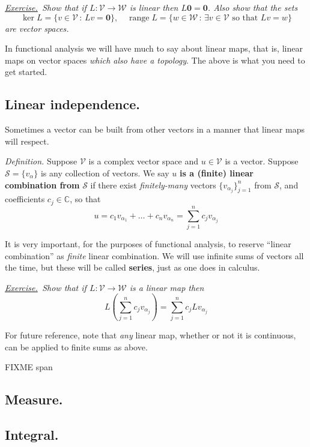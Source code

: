 \documentclass[12pt]{article}
\newcommand{\bzero}{\bm{0}}
\newcommand{\cS}{\mathcal{S}}
\newcommand{\cV}{\mathcal{V}}
\newcommand{\cW}{\mathcal{W}}
\newcommand{\CC}{\mathbb{C}}
\newcommand{\range}{\operatorname{range}}
\newcommand{\sect}[1]{\subsection*{#1.}}
\newcommand{\defin}{\emph{Definition.}\,\,}
\newcommand{\exer}[2]{\emph{\underline{Exercise.}\, #2} \vspace*{#1mm}}
\begin{document}
\clearpage\newpage
\exer{60}{Show that if $L:\cV \to \cW$ is linear then $L\bzero = \bzero$.  Also show that the sets
    $$\ker L = \{v\in\cV\,:\,Lv=\bzero\}, \quad \range L = \{w\in\cW\,:\,\exists v \in \cV \text{ so that } Lv=w\}$$
are vector spaces.}

In functional analysis we will have much to say about linear maps, that is, linear maps on vector spaces \emph{which also have a topology}.  The above is what you need to get started.


\sect{Linear independence}  Sometimes a vector can be built from other vectors in a manner that linear maps will respect.

\defin Suppose $\cV$ is a complex vector space and $u \in \cV$ is a vector.  Suppose $\cS = \{v_\alpha\}$ is any collection of vectors.  We say $u$ \textbf{is a (finite) linear combination from} $\cS$ if there exist \emph{finitely-many} vectors $\{v_{\alpha_j}\}_{j=1}^n$ from $\cS$, and coefficients $c_j\in\CC$, so that
	$$u = c_1 v_{\alpha_1} + \dots + c_n v_{\alpha_n} = \sum_{j=1}^n c_j v_{\alpha_j}$$

It is very important, for the purposes of functional analysis, to reserve ``linear combination'' as \emph{finite} linear combination.  We will use infinite sums of vectors all the time, but these will be called \textbf{series}, just as one does in calculus.

\exer{15}{Show that if $L:\cV \to \cW$ is a linear map then
	$$L\left(\sum_{j=1}^n c_j v_{\alpha_j}\right) = \sum_{j=1}^n c_j L v_{\alpha_j}$$}

\clearpage\newpage
For future reference, note that \emph{any} linear map, whether or not it is continuous, can be applied to finite sums as above.

FIXME span


\sect{Measure}

\sect{Integral}
\end{document}
